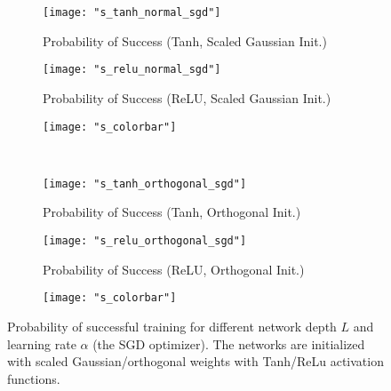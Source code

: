 \begin{figure}[h]
\centering
\newcommand{\myWidth}{0.28\textwidth}
\newcommand{\myspace}{\hspace{3mm}}
\begin{subfigure}{\myWidth}
  \centering
  \caption{Probability of Success (Tanh, Scaled Gaussian Init.)}
  \texttt{[image: "s\_tanh\_normal\_sgd"]}
  \label{fig:mnist_sgd_s1}
\end{subfigure}\myspace%
\begin{subfigure}{\myWidth}
  \centering
  \caption{Probability of Success (ReLU, Scaled Gaussian Init.)}
  \texttt{[image: "s\_relu\_normal\_sgd"]}
  \label{fig:mnist_sgd_s2}
\end{subfigure}\myspace
\begin{subfigure}{8mm}
  \texttt{[image: "s\_colorbar"]}
\end{subfigure}%
\\
\begin{subfigure}{\myWidth}
  \centering
  \caption{Probability of Success (Tanh, Orthogonal Init.)}
  \texttt{[image: "s\_tanh\_orthogonal\_sgd"]}
  \label{fig:mnist_sgd_s3}
\end{subfigure}\myspace
\begin{subfigure}{\myWidth}
  \centering
  \caption{Probability of Success (ReLU, Orthogonal Init.)}
  \texttt{[image: "s\_relu\_orthogonal\_sgd"]}
  \label{fig:mnist_sgd_s4}
\end{subfigure}\myspace
\begin{subfigure}{8mm}
  \texttt{[image: "s\_colorbar"]}
\end{subfigure}%
\caption{Probability of successful training for different network depth $L$ and learning rate $\alpha$ (the SGD optimizer). The networks are initialized with scaled Gaussian/orthogonal weights with Tanh/ReLu activation functions.
}
\label{fig:mnist_sgd}
\end{figure}